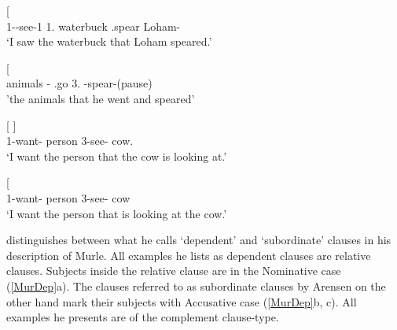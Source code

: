 \begin{exe}\ex\label{TenRel} 
\begin{xlist}
\ex\gll{}    {\rm[}   \textipa{l\=*oh\'{\=*a}m\textbf{-i}}{\rm]}\\
       1-\pfv{}-see-1\sg{}     1\sg{}.\nom{}     waterbuck                  \hspaceThis{[}\am{} \pst{} \pfv{}.spear Loham-\nom{}\\
\glt `I saw the waterbuck that Loham speared.' 

\ex\gll{}  {\rm[}  \textbf{} \textipa{\'a-k\'at-a}{\rm]}\\
animals \hspaceThis{[}\am{}-\pl{} \pfv{}.go 3\sg{}.\nom{} \pfv{}-spear-{(pause)}\\
\glt 'the animals that he went and speared' 
\end{xlist}
\end{exe}

\begin{exe}\ex\label{NanRel}
\begin{xlist}
\ex\gll{}   {\rm[}  \textbf{}{\rm]}\\
1\sg{}-want-\ipfv{} person \hspaceThis{[}\relativ{} 3-see-\ipfv{} cow.\nom{}\\
\glt `I want the person that the cow is looking at.'

\ex\gll{}   {\rm[}  \textipa{te:t\`a}{\rm]}\\
1\sg{}-want-\ipfv{} person \hspaceThis{[}\relativ{} 3-see-\ipfv{} cow\\
\glt `I want the person that is looking at the cow.'

\end{xlist}
\end{exe}

\citet[112--114]{Arensen:1982} distinguishes between what he calls `dependent' and `subordinate' clauses in his description of Murle. 
All examples he lists as dependent clauses are relative clauses. 
Subjects inside the relative clause are in the Nominative  case (\ref{MurDep}a). 
The clauses referred to as subordinate clauses by Arensen on the other hand mark their subjects with Accusative case (\ref{MurDep}b, c). 
All examples he presents are of the complement clause-type.

